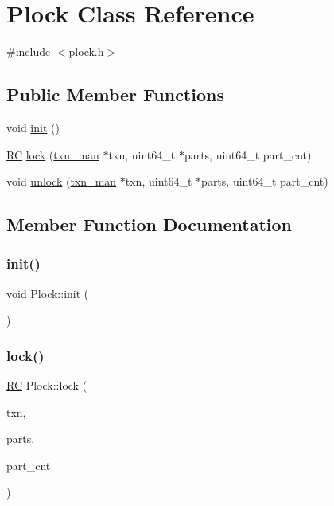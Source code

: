 \hypertarget{classPlock}{}\section{Plock Class Reference}
\label{classPlock}


{\ttfamily \#include $<$plock.\+h$>$}

\subsection*{Public Member Functions}
\begin{DoxyCompactItemize}
\item 
void \hyperlink{classPlock_a2df75b74e1d452ba8ff37ae07496ee47}{init} ()
\item 
\hyperlink{global_8h_a78c49a674c810fdd03d20432f7be864a}{RC} \hyperlink{classPlock_aa26355910930e58335fff993d406a7fc}{lock} (\hyperlink{classtxn__man}{txn\+\_\+man} $\ast$txn, uint64\+\_\+t $\ast$parts, uint64\+\_\+t part\+\_\+cnt)
\item 
void \hyperlink{classPlock_a46c8686bc53666538d48a8602b7098bc}{unlock} (\hyperlink{classtxn__man}{txn\+\_\+man} $\ast$txn, uint64\+\_\+t $\ast$parts, uint64\+\_\+t part\+\_\+cnt)
\end{DoxyCompactItemize}


\subsection{Member Function Documentation}
\mbox{\label{classPlock_a2df75b74e1d452ba8ff37ae07496ee47}} 
\subsubsection{\texorpdfstring{init()}{init()}}
{\footnotesize\ttfamily void Plock\+::init (\begin{DoxyParamCaption}{ }\end{DoxyParamCaption})}

\mbox{\label{classPlock_aa26355910930e58335fff993d406a7fc}} 
\subsubsection{\texorpdfstring{lock()}{lock()}}
{\footnotesize\ttfamily \hyperlink{global_8h_a78c49a674c810fdd03d20432f7be864a}{RC} Plock\+::lock (\begin{DoxyParamCaption}\item[{\hyperlink{classtxn__man}{txn\+\_\+man} $\ast$}]{txn,  }\item[{uint64\+\_\+t $\ast$}]{parts,  }\item[{uint64\+\_\+t}]{part\+\_\+cnt }\end{DoxyParamCaption})}

